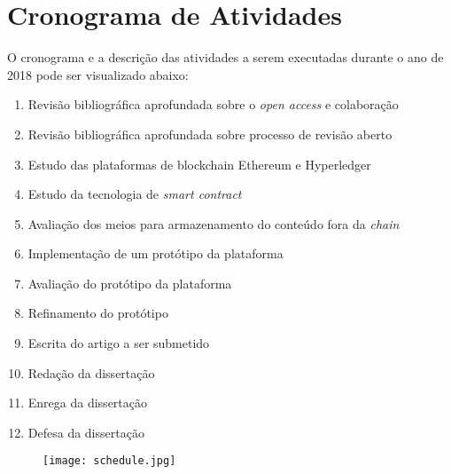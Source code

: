 \chapter{Cronograma de Atividades}

O cronograma e a descrição das atividades a serem executadas durante o ano de 2018 pode ser visualizado abaixo:
\begin{enumerate}
  \item Revisão bibliográfica aprofundada sobre o \textit{open access} e colaboração
  \item Revisão bibliográfica aprofundada sobre processo de revisão aberto
  \item Estudo das plataformas de blockchain Ethereum e Hyperledger
  \item Estudo da tecnologia de \textit{smart contract}
  \item Avaliação dos meios para armazenamento do conteúdo fora da \textit{chain}
  \item Implementação de um protótipo da plataforma
  \item Avaliação do protótipo da plataforma
  \item Refinamento do protótipo
  \item Escrita do artigo a ser submetido
  \item Redação da dissertação
  \item Enrega da dissertação
  \item Defesa da dissertação
\end{enumerate}
\begin{figure}[!h]
\centering
\texttt{[image: schedule.jpg]}
\end{figure}